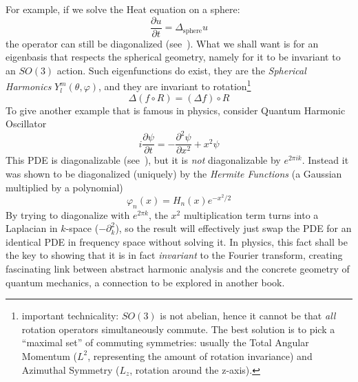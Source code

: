 \documentclass{article}
\renewcommand{\phi}{\varphi}
\let\temp\phi
\let\phi\varphi
\let\varphi\temp
\begin{document}
For example, if we solve the Heat equation on a sphere:
\[
	\frac{\partial u}{\partial t} = \Delta_{\text{sphere}} u
\]
the operator can still be diagonalized (see~\cite{NatePDE}). What we shall want is for an eigenbasis that
respects the spherical geometry,
namely for it to be invariant to an $SO(3)$ action. Such eigenfunctions do exist, they are the \emph{Spherical Harmonics}
$Y_{l}^{m}(\theta, \phi)$, and they are invariant to rotation\footnote{important technicality: $SO(3)$ is not
abelian, hence it cannot be that \emph{all} rotation operators simultaneously commute. The best solution
is to pick a ``maximal set'' of commuting symmetries: usually the Total Angular Momentum ($L^2$,
representing the amount of rotation invariance) and Azimuthal Symmetry ($L_z$, rotation around the
z-axis).}
\[
	\Delta (f \circ R) = (\Delta f) \circ R
\]
To give another example that is famous in physics, consider Quantum Harmonic Oscillator
\[
	i \frac{\partial \psi}{\partial t} = -\frac{\partial^2 \psi}{\partial x^2} + x^2 \psi
\]
This PDE is diagonalizable (see~\cite{NatePDE}), but it is \emph{not} diagonalizable by $e^{2\pi i k}$.
Instead it was shown to be diagonalized (uniquely) by the \emph{Hermite Functions} (a Gaussian multiplied by a polynomial)
\[
	\phi_n(x) = H_n(x) e^{-x^2/2}
\]
By trying to diagonalize with $e^{2\pi k}$, the $x^2$ multiplication term turns into a Laplacian in $k$-space
($-\partial_k^2$), so the result will effectively just swap the PDE for an identical PDE in frequency space
without solving it. In physics, this fact shall be the key to showing that it is in fact \emph{invariant} to
the Fourier transform, creating fascinating link between abstract harmonic analysis and the concrete geometry
of quantum mechanics, a connection to be explored in another book.

\end{document}
